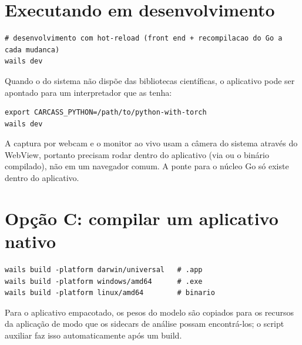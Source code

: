 \section{Executando em desenvolvimento}

\begin{lstlisting}
# desenvolvimento com hot-reload (front end + recompilacao do Go a cada mudanca)
wails dev
\end{lstlisting}

Quando o  do sistema não dispõe das bibliotecas científicas, o
aplicativo pode ser apontado para um interpretador que as tenha:

\begin{lstlisting}
export CARCASS_PYTHON=/path/to/python-with-torch
wails dev
\end{lstlisting}

\begin{note}[title={A câmera e o WebView}]
A captura por webcam e o monitor ao vivo usam a câmera do sistema através do WebView,
portanto precisam rodar dentro do aplicativo (via  ou o binário
compilado), não em um navegador comum. A ponte para o núcleo Go só existe dentro
do aplicativo.
\end{note}

\section{Opção C: compilar um aplicativo nativo}

\begin{lstlisting}
wails build -platform darwin/universal   # .app
wails build -platform windows/amd64      # .exe
wails build -platform linux/amd64        # binario
\end{lstlisting}

Para o aplicativo empacotado, os pesos do modelo são copiados para os recursos da
aplicação de modo que os sidecars de análise possam encontrá-los; o script auxiliar
 faz isso automaticamente após um build.
